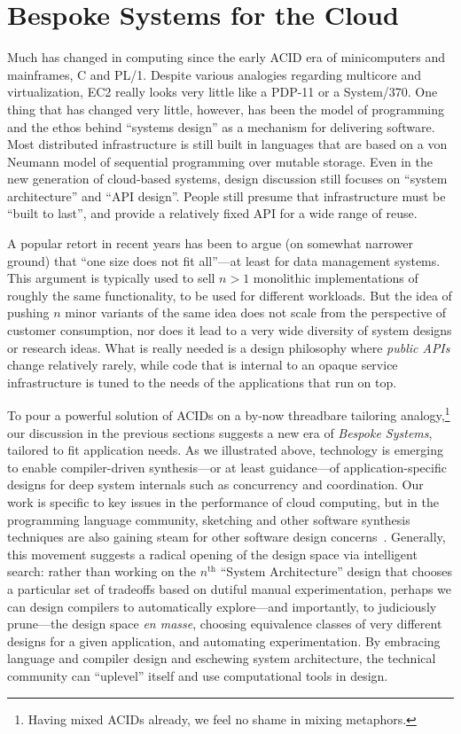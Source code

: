 \documentclass{sig-alternate}
\begin{document}
\section{Bespoke Systems for the Cloud}
Much has changed in computing since the early ACID era of minicomputers and mainframes, C and PL/1.  Despite various analogies regarding multicore and virtualization, EC2 really looks very little like a PDP-11 or a System/370.  One thing that has changed very little, however, has been the model of programming and the ethos behind ``systems design'' as a mechanism for delivering software.  Most distributed infrastructure is still built in languages that are based on a von Neumann model of sequential programming over mutable storage.  Even in the new generation of cloud-based systems, design discussion still focuses on ``system architecture'' and ``API design''.  People still presume that infrastructure must be ``built to last'', and provide a relatively fixed API for a wide range of reuse.  

A popular retort in recent years has been to argue (on somewhat narrower ground)
that ``one size does not fit all''---at least for data management systems.  This
argument is typically used to sell $n>1$ monolithic implementations of roughly the same functionality, to be used for different workloads.  But the idea of pushing $n$ minor variants of the same idea does not scale from the perspective of customer consumption, nor does it lead to a very wide diversity of system designs or research ideas.  What is really needed is a design philosophy where \emph{public APIs} change relatively rarely, while code that is internal to an opaque service infrastructure is tuned to the needs of the applications that run on top.

To pour a powerful solution of ACIDs on a by-now threadbare tailoring
analogy,\footnote{Having mixed ACIDs already, we feel no shame in mixing
  metaphors.} our discussion in the previous sections suggests a new era of
\emph{Bespoke Systems}, tailored to fit application needs.  As we illustrated
above, technology is emerging to enable compiler-driven synthesis---or at least
guidance---of application-specific designs for deep system internals such as concurrency and coordination.  Our work is specific to key issues in the performance of cloud computing, but in the programming language community, sketching and other software synthesis techniques are also gaining steam for other software design concerns~\cite{Kuncak2012}.  Generally, this movement suggests a radical opening of the design space via intelligent search: rather than working on the $n^\textrm{th}$ ``System Architecture'' design that chooses a particular set of tradeoffs based on dutiful manual experimentation, perhaps we can design compilers to automatically explore---and importantly, to judiciously prune---the design space \emph{en masse}, choosing equivalence classes of very different designs for a given application, and automating experimentation.  By embracing language and compiler design and eschewing system architecture, the technical community can ``uplevel'' itself and use computational tools in design.
\end{document}

